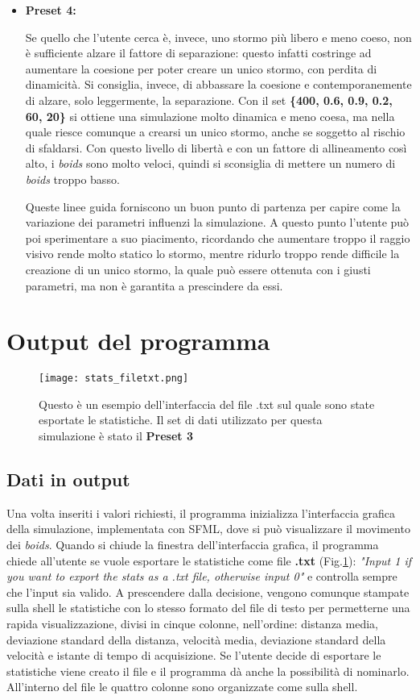 \documentclass{article}
\begin{document}
\begin{itemize}
\item \large\textbf{Preset 4:} \normalsize

Se quello che l'utente cerca è, invece, uno stormo più libero e meno coeso, non è sufficiente alzare il fattore di separazione: questo infatti costringe ad aumentare la coesione per poter creare un unico stormo, con perdita di dinamicità. Si consiglia, invece, di abbassare la coesione e contemporanemente di alzare, solo leggermente, la separazione. Con il set \textbf{\{400, 0.6, 0.9, 0.2, 60, 20\}} si ottiene una simulazione molto dinamica e meno coesa, ma nella quale riesce comunque a crearsi un unico stormo, anche se soggetto al rischio di sfaldarsi. Con questo livello di libertà e con un fattore di allineamento così alto, i \textit{boids} sono molto veloci, quindi si sconsiglia di mettere un numero di \textit{boids} troppo basso. 

\medskip
Queste linee guida forniscono un buon punto di partenza per capire come la variazione dei parametri influenzi la simulazione. A questo punto l'utente può poi sperimentare a suo piacimento, ricordando che aumentare troppo il raggio visivo rende molto statico lo stormo, mentre ridurlo troppo rende difficile la creazione di un unico stormo, la quale può essere ottenuta con i giusti parametri, ma non è garantita a prescindere da essi. 

\end{itemize} 


\section{Output del programma}
\begin{figure}[h]
\centering
\texttt{[image: stats\_filetxt.png]}
\caption{\label{fig:stats_file}}Questo è un esempio dell'interfaccia del file .txt sul quale sono state esportate le statistiche. Il set di dati utilizzato per questa simulazione è stato il \textbf{Preset 3}
\end{figure} 

\subsection{Dati in output}
Una volta inseriti i valori richiesti, il programma inizializza l'interfaccia grafica della simulazione, implementata con SFML, dove si può visualizzare il movimento dei \textit{boids}. Quando si chiude la finestra dell'interfaccia grafica, il programma chiede all'utente se vuole esportare le statistiche come file \textbf{.txt} (Fig.\ref{fig:stats_file}): \textit{"Input 1 if you want to export the stats as a .txt file, otherwise input 0"} e controlla sempre che l'input sia valido. A prescendere dalla decisione, vengono comunque stampate sulla shell le statistiche con lo stesso formato del file di testo per permetterne una rapida visualizzazione, divisi in cinque colonne, nell'ordine: distanza media, deviazione standard della distanza, velocità media, deviazione standard della velocità e istante di tempo di acquisizione. Se l'utente decide di esportare le statistiche viene creato il file e il programma dà anche la possibilità di nominarlo. All'interno del file le quattro colonne sono organizzate come sulla shell. 
\end{document}

